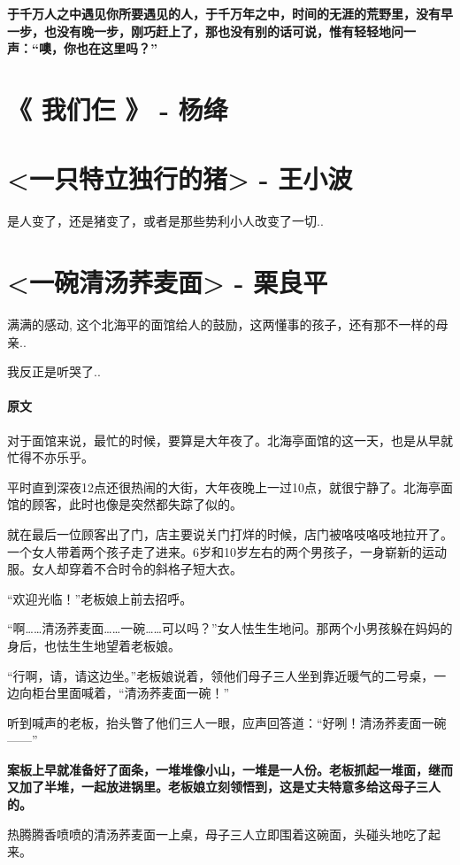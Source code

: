 \documentclass[UTF8,a4paper,8pt]{ctexart}
\begin{document}
 \textbf{于千万人之中遇见你所要遇见的人，于千万年之中，时间的无涯的荒野里，没有早一步，也没有晚一步，刚巧赶上了，那也没有别的话可说，惟有轻轻地问一声：“噢，你也在这里吗？”}
 
 \newpage
 \section{《 我们仨 》 - 杨绛}
 
 \newpage
 \section{<一只特立独行的猪> - 王小波}
 是人变了，还是猪变了，或者是那些势利小人改变了一切..
 
 \newpage
 \section{<一碗清汤荞麦面> - 栗良平}
 满满的感动, 这个北海平的面馆给人的鼓励，这两懂事的孩子，还有那不一样的母亲..
 
 我反正是听哭了..
 
 \paragraph{原文}
 对于面馆来说，最忙的时候，要算是大年夜了。北海亭面馆的这一天，也是从早就忙得不亦乐乎。
 
 平时直到深夜12点还很热闹的大街，大年夜晚上一过10点，就很宁静了。北海亭面馆的顾客，此时也像是突然都失踪了似的。
 
 就在最后一位顾客出了门，店主要说关门打烊的时候，店门被咯吱咯吱地拉开了。一个女人带着两个孩子走了进来。6岁和10岁左右的两个男孩子，一身崭新的运动服。女人却穿着不合时令的斜格子短大衣。
 
 “欢迎光临！”老板娘上前去招呼。
 
 “啊……清汤荞麦面……一碗……可以吗？”女人怯生生地问。那两个小男孩躲在妈妈的身后，也怯生生地望着老板娘。
 
 “行啊，请，请这边坐。”老板娘说着，领他们母子三人坐到靠近暖气的二号桌，一边向柜台里面喊着，“清汤荞麦面一碗！”
 
 听到喊声的老板，抬头瞥了他们三人一眼，应声回答道：“好咧！清汤荞麦面一碗——”
 
 \textbf{案板上早就准备好了面条，一堆堆像小山，一堆是一人份。老板抓起一堆面，继而又加了半堆，一起放进锅里。老板娘立刻领悟到，这是丈夫特意多给这母子三人的。}
 
 热腾腾香喷喷的清汤荞麦面一上桌，母子三人立即围着这碗面，头碰头地吃了起来。
 
\end{document}
